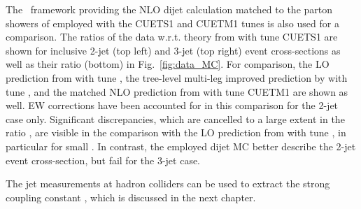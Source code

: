 The \POWHEG~framework providing the NLO dijet calculation matched to the parton showers of \PYTHIAE employed with the CUETS1 and CUETM1 tunes \cite{Khachatryan:2015pea} is also used for a comparison. The ratios of the data w.r.t. theory from \POWHEGn \plusn \PYTHIAE with tune CUETS1 are shown for inclusive 2-jet (top left) and 3-jet (top right) event cross-sections as well as their ratio \ratio (bottom) in Fig.~\ref{fig:data_MC}. For comparison, the LO prediction from \PYTHIAS with tune \Ztwostar, the tree-level multi-leg improved prediction by \MadGraphFn \plusn \PYTHIAS with tune \Ztwostar, and the matched NLO prediction from \POWHEGn \plusn \PYTHIAE with tune CUETM1 are shown as well. EW corrections have been accounted for in this comparison for the 2-jet case only. Significant discrepancies, which are cancelled to a large extent in the ratio \ratio, are visible in the comparison with the LO prediction from \MadGraphFn \plusn \PYTHIAS with tune \Ztwostar, in particular for small \httwo. In contrast, the employed dijet MC \POWHEGn \plusn \PYTHIAE better describe the 2-jet event cross-section, but fail for the 3-jet case.

The jet measurements at hadron colliders can be used to extract the strong coupling constant \alps, which is discussed in the next chapter.
